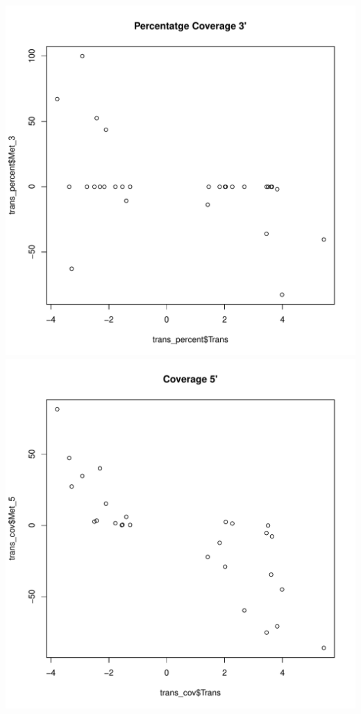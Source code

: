 \documentclass{article}\usepackage[]{graphicx}\usepackage[]{color}
\makeatletter
\def\maxwidth{ %
  \ifdim\Gin@nat@width>\linewidth
    \linewidth
  \else
    \Gin@nat@width
  \fi
}
\newenvironment{knitrout}{}{} %
\makeatother
\begin{document}
\begin{knitrout}
{\includegraphics[width=\maxwidth]{figure/minimal-correlacions_trans-3} 
\includegraphics[width=\maxwidth]{figure/minimal-correlacions_trans-4} 
}
\end{knitrout}
\end{document}
